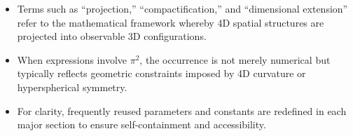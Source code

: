 \documentclass[12pt,a4paper]{article}
\begin{document}
\begin{itemize}
    \item Terms such as “projection,” “compactification,” and “dimensional extension” refer to the mathematical framework whereby 4D spatial structures are projected into observable 3D configurations.
    
    \item When expressions involve \(\pi^2\), the occurrence is not merely numerical but typically reflects geometric constraints imposed by 4D curvature or hyperspherical symmetry.

    \item For clarity, frequently reused parameters and constants are redefined in each major section to ensure self-containment and accessibility.
\end{itemize}
\end{document}
